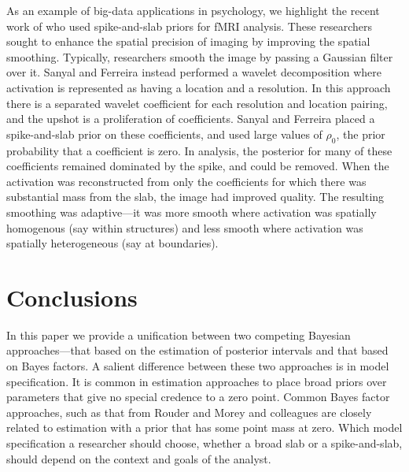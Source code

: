 As an example of big-data applications in psychology, we highlight the recent work of  who used spike-and-slab priors for fMRI analysis.  These researchers sought to enhance the spatial precision of imaging by improving the spatial smoothing.  Typically, researchers smooth the image by passing a Gaussian filter over it.  Sanyal and Ferreira instead performed a wavelet decomposition where activation is represented as having a location and a resolution.  In this approach there is a separated wavelet coefficient for each resolution and location pairing, and the upshot is a proliferation of coefficients.  Sanyal and Ferreira placed a spike-and-slab prior on these coefficients, and used large values of $\rho_0$, the prior probability that a coefficient is zero.  In analysis, the posterior for many of these coefficients remained dominated by the spike, and could be removed.  When the activation was reconstructed from only the coefficients for which there was substantial mass from the slab, the image had improved quality.  The resulting smoothing was adaptive---it was more smooth where activation was spatially homogenous (say within structures) and less smooth where activation was spatially heterogeneous (say at boundaries).  

\section{Conclusions}
In this paper we provide a unification between two competing Bayesian approaches---that based on the estimation of posterior intervals and that based on Bayes factors.  A salient difference between these two approaches is in model specification.  It is common in estimation approaches to place broad priors over parameters that give no special credence to a zero point.  Common Bayes factor approaches, such as that from Rouder and Morey and colleagues \cite{Rouder:etal:2009a,Rouder:Morey:2012,Rouder:etal:2012,Guan:Vandekerckhove:2015} are closely related to estimation with a prior that has some point mass at zero.  Which model specification a researcher should choose, whether a broad slab or a spike-and-slab, should depend on the context and goals of the analyst. 





